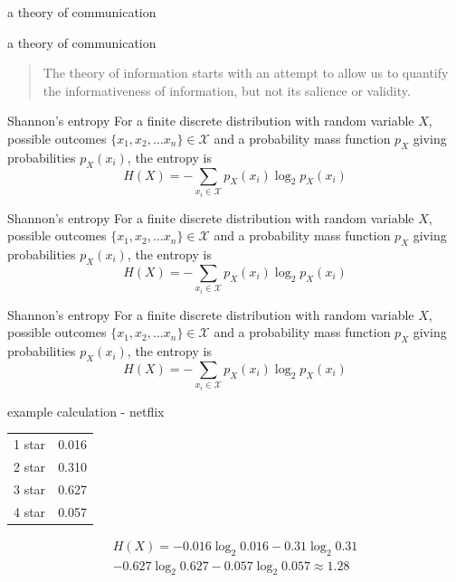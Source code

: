 \documentclass{beamer}
\newcommand{\crish}{\color{reddish}}
\newcommand{\cbla}{\color{black}}
\newcommand{\cblu}{\color{blue}}
\newcommand{\sm}{\color{reddish}$}
\newcommand{\fm}{$\color{black}}
\begin{document}
\begin{frame}{a theory of communication}
  \begin{center}
  \end{center}
\end{frame}
\begin{frame}{a theory of communication}
  \begin{quote}
    The theory of information starts with an attempt to allow us to
quantify the informativeness of information, but not its salience or
validity.
  \end{quote}
  \end{frame}
\begin{frame}{Shannon's entropy}
  For a finite discrete distribution with random variable \sm X\fm,
  possible outcomes \sm\{x_1,x_2,\ldots x_n\}\in\mathcal{X}\fm{} and a
  probability mass function \sm p_X\fm{} giving probabilities \sm p_X(x_i)\fm, the
  entropy is
\crish
  $$
H(X)=-\sum_{x_i\in \mathcal{X}}{p_X(x_i)\log_2p_X(x_i)}
  $$
\cbla
\end{frame}
\begin{frame}{Shannon's entropy}
  For a finite discrete distribution with random variable \sm X\fm,
  possible outcomes \cblu $\{x_1,x_2,\ldots x_n\}\in\mathcal{X}$\cbla{} and a
  probability mass function \sm p_X\fm{} giving probabilities \sm p_X(x_i)\fm, the
  entropy is
\crish
  $$
H(X)=-\sum_{x_i\in \mathcal{X}}{p_X(x_i)\log_2p_X(x_i)}
  $$
\cbla
\end{frame}
\begin{frame}{Shannon's entropy}
  For a finite discrete distribution with random variable \sm X\fm,
  possible outcomes \sm\{x_1,x_2,\ldots x_n\}\in\mathcal{X}\fm{} and a
  probability mass function \sm p_X\fm{} giving probabilities \cblu$ p_X(x_i)$\cbla, the
  entropy is
\crish
  $$
H(X)=-\sum_{x_i\in \mathcal{X}}{p_X(x_i)\log_2p_X(x_i)}
  $$
\cbla
\end{frame}
\begin{frame}{example calculation - netflix}
  \begin{center}
    \begin{tabular}{l|l}
      \hline
      1 star&0.016\\
      2 star&0.310\\
      3 star&0.627\\
      4 star&0.057\\
      \hline
    \end{tabular}
  \end{center}
  \crish
  \begin{multline*}
    H(X)=-0.016\log_2{0.016}-0.31\log_2{0.31}\\
    -0.627\log_2{0.627}-0.057\log_2{0.057}\approx 1.28
\end{multline*}
\cbla
\end{frame}  
\end{document}
